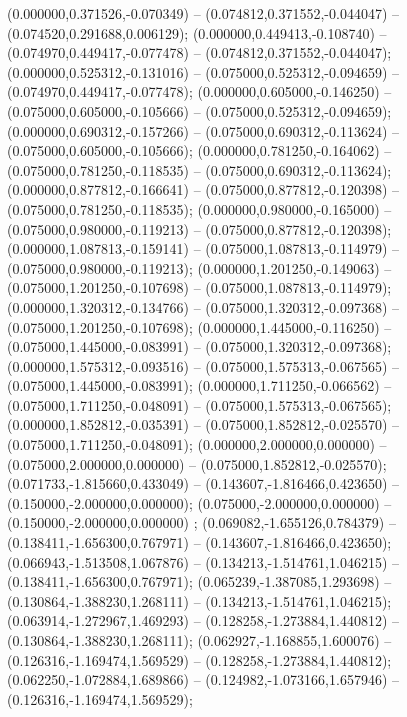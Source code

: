  (0.000000,0.371526,-0.070349) -- (0.074812,0.371552,-0.044047) -- (0.074520,0.291688,0.006129);
 (0.000000,0.449413,-0.108740) -- (0.074970,0.449417,-0.077478) -- (0.074812,0.371552,-0.044047);
 (0.000000,0.525312,-0.131016) -- (0.075000,0.525312,-0.094659) -- (0.074970,0.449417,-0.077478);
 (0.000000,0.605000,-0.146250) -- (0.075000,0.605000,-0.105666) -- (0.075000,0.525312,-0.094659);
 (0.000000,0.690312,-0.157266) -- (0.075000,0.690312,-0.113624) -- (0.075000,0.605000,-0.105666);
 (0.000000,0.781250,-0.164062) -- (0.075000,0.781250,-0.118535) -- (0.075000,0.690312,-0.113624);
 (0.000000,0.877812,-0.166641) -- (0.075000,0.877812,-0.120398) -- (0.075000,0.781250,-0.118535);
 (0.000000,0.980000,-0.165000) -- (0.075000,0.980000,-0.119213) -- (0.075000,0.877812,-0.120398);
 (0.000000,1.087813,-0.159141) -- (0.075000,1.087813,-0.114979) -- (0.075000,0.980000,-0.119213);
 (0.000000,1.201250,-0.149063) -- (0.075000,1.201250,-0.107698) -- (0.075000,1.087813,-0.114979);
 (0.000000,1.320312,-0.134766) -- (0.075000,1.320312,-0.097368) -- (0.075000,1.201250,-0.107698);
 (0.000000,1.445000,-0.116250) -- (0.075000,1.445000,-0.083991) -- (0.075000,1.320312,-0.097368);
 (0.000000,1.575312,-0.093516) -- (0.075000,1.575313,-0.067565) -- (0.075000,1.445000,-0.083991);
 (0.000000,1.711250,-0.066562) -- (0.075000,1.711250,-0.048091) -- (0.075000,1.575313,-0.067565);
 (0.000000,1.852812,-0.035391) -- (0.075000,1.852812,-0.025570) -- (0.075000,1.711250,-0.048091);
 (0.000000,2.000000,0.000000) -- (0.075000,2.000000,0.000000) -- (0.075000,1.852812,-0.025570);
 (0.071733,-1.815660,0.433049) -- (0.143607,-1.816466,0.423650) -- (0.150000,-2.000000,0.000000);
 (0.075000,-2.000000,0.000000) -- (0.150000,-2.000000,0.000000) ;
 (0.069082,-1.655126,0.784379) -- (0.138411,-1.656300,0.767971) -- (0.143607,-1.816466,0.423650);
 (0.066943,-1.513508,1.067876) -- (0.134213,-1.514761,1.046215) -- (0.138411,-1.656300,0.767971);
 (0.065239,-1.387085,1.293698) -- (0.130864,-1.388230,1.268111) -- (0.134213,-1.514761,1.046215);
 (0.063914,-1.272967,1.469293) -- (0.128258,-1.273884,1.440812) -- (0.130864,-1.388230,1.268111);
 (0.062927,-1.168855,1.600076) -- (0.126316,-1.169474,1.569529) -- (0.128258,-1.273884,1.440812);
 (0.062250,-1.072884,1.689866) -- (0.124982,-1.073166,1.657946) -- (0.126316,-1.169474,1.569529);

